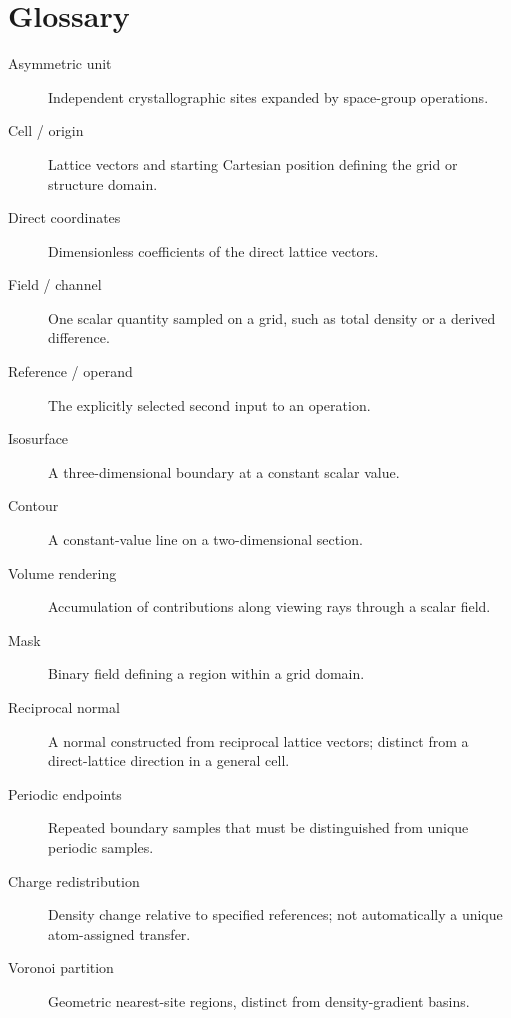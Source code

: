 \section{Glossary}
\begin{description}
\item[Asymmetric unit] Independent crystallographic sites expanded by space-group operations.
\item[Cell / origin] Lattice vectors and starting Cartesian position defining the grid or structure domain.
\item[Direct coordinates] Dimensionless coefficients of the direct lattice vectors.
\item[Field / channel] One scalar quantity sampled on a grid, such as total density or a derived difference.
\item[Reference / operand] The explicitly selected second input to an operation.
\item[Isosurface] A three-dimensional boundary at a constant scalar value.
\item[Contour] A constant-value line on a two-dimensional section.
\item[Volume rendering] Accumulation of contributions along viewing rays through a scalar field.
\item[Mask] Binary field defining a region within a grid domain.
\item[Reciprocal normal] A normal constructed from reciprocal lattice vectors; distinct from a direct-lattice direction in a general cell.
\item[Periodic endpoints] Repeated boundary samples that must be distinguished from unique periodic samples.
\item[Charge redistribution] Density change relative to specified references; not automatically a unique atom-assigned transfer.
\item[Voronoi partition] Geometric nearest-site regions, distinct from density-gradient basins.
\end{description}

